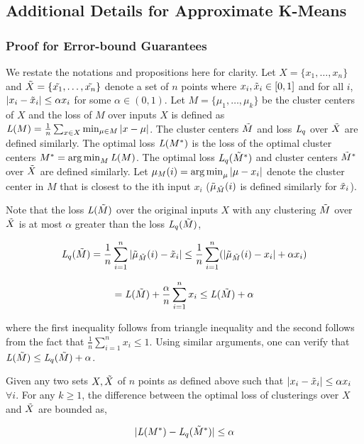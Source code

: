 
\subsection{Additional Details for Approximate K-Means}\label{app:kmeans}

\subsubsection{Proof for Error-bound Guarantees}


We restate the notations and propositions here for clarity. Let $X= \{ x_1, \ldots, x_n\}$ and $\tilde{X} = \{ \tilde{x_1}, \ldots, \tilde{x_n}\}$ denote a set of $n$ points where $x_i, \tilde{x}_i \in [0,1]$ and for all $i$, $|x_i - \tilde{x}_{i}| \leq \alpha x_i$ for some $\alpha \in (0,1)$. Let $M = \{\mu_1, \ldots, \mu_k\}$ be the cluster centers of $X$ and the loss of $M$ over inputs $X$ is defined as $\mathit{L}(M) = \frac{1}{n}\sum_{x \in X} \min_{\mu \in M} |x - \mu|$. The cluster centers $\tilde{M}$ and loss $\mathit{L}_q$ over $\tilde{X}$ are defined similarly. The optimal loss $\mathit{L}(M^{*})$ is the loss of the optimal cluster centers $M^{*} = \operatorname*{\arg\min}_{M} \mathit{L}(M)$. The optimal loss $\mathit{L}_q(\tilde{M}^{*})$ and cluster centers $\tilde{M}^{*}$ over $\tilde{X}$ are defined similarly. Let $\mu_{M}(i) = \operatorname*{\arg\min}_{\mu} |\mu - x_i|$ denote the cluster center in $M$ that is closest to the ith input $x_i$ ($\tilde{\mu}_{\tilde{M}}(i)$ is defined similarly for $\tilde{x}_{i}$).



Note that the loss $\mathit{L}(\tilde{M})$ over the original inputs $X$ with any clustering $\tilde{M}$ over $\tilde{X}$ is at most $\alpha$ greater than the loss $\mathit{L}_q(\tilde{M})$,

\[   
    \mathit{L}_q(\tilde{M}) = \frac{1}{n} \sum_{i=1}^n |\tilde{\mu}_{\tilde{M}}(i) - \tilde{x}_{i}|  \leq \frac{1}{n} \sum_{i=1}^n (|\tilde{\mu}_{\tilde{M}}(i) - x_i| + \alpha x_i) 
\]

\[
 = \mathit{L}(\tilde{M}) + \frac{\alpha}{n} \sum_{i=1}^n x_i \leq \mathit{L}(\tilde{M}) + \alpha
\]

where the first inequality follows from triangle inequality and the second follows from the fact that $\frac{1}{n}\sum_{i=1}^n x_i \leq 1$. Using similar arguments, one can verify that $\mathit{L}(\tilde{M}) \leq \mathit{L}_q(\tilde{M}) + \alpha$.

\begin{proposition}
Given any two sets $X, \tilde{X}$ of $n$ points as defined above such that $|x_i - \tilde{x}_{i}| \leq \alpha x_i$ $\forall i$. For any $k \geq 1$, the difference between the optimal loss of clusterings over $X$ and $\tilde{X}$ are bounded as, 

\begin{equation}
    |\mathit{L}(M^{*}) - \mathit{L}_q(\tilde{M}^{*})| \leq \alpha
\end{equation}
\end{proposition}

